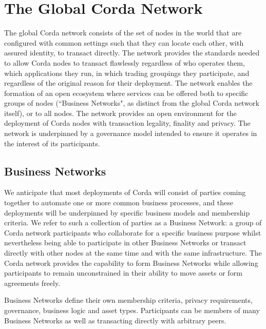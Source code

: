 \documentclass{article}
\begin{document}
\section{The Global Corda Network}
The global Corda network consists of the set of nodes in the world that are configured with common settings such that they can locate each other, with assured identity, to transact directly. The network provides the standards needed to allow Corda nodes to transact flawlessly regardless of who operates them, which applications they run, in which trading groupings they participate, and regardless of the original reason for their deployment. The network enables the formation of an open ecosystem where services can be offered both to specific groups of nodes (``Business Networks", as distinct from the global Corda network itself), or to all nodes. The network provides an open environment for the deployment of Corda nodes with transaction legality, finality and privacy. The network is underpinned by a governance model intended to ensure it operates in the interest of its participants.

\subsection{Business Networks} \label{businessnetworks}
We anticipate that most deployments of Corda will consist of parties coming together to automate one or more common business processes, and these deployments will be underpinned by specific business models and membership criteria. We refer to such a collection of parties as a Business Network: a group of Corda network participants who collaborate for a specific business purpose whilst nevertheless being able to participate in other Business Networks or transact directly with other nodes at the same time and with the same infrastructure. The Corda network provides the capability to form Business Networks while allowing participants to remain unconstrained in their ability to move assets or form agreements freely.

Business Networks define their own membership criteria, privacy requirements, governance, business logic and asset types. Participants can be members of many Business Networks as well as transacting directly with arbitrary peers.
\end{document}
